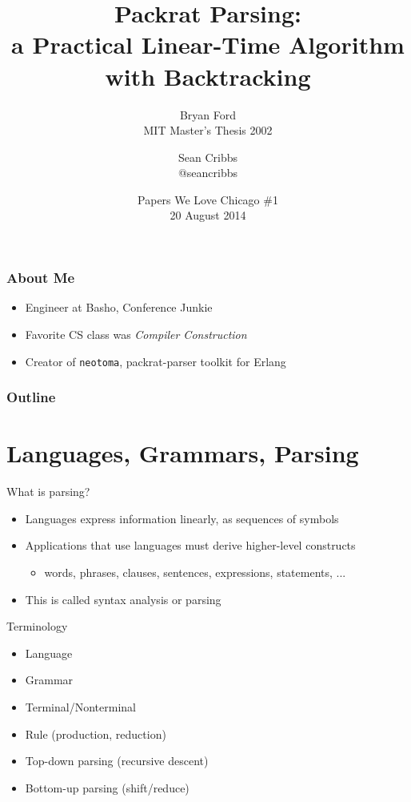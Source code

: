 \documentclass{beamer}
\title[Packrat Parsing]{Packrat Parsing:
  \\a Practical Linear-Time
  Algorithm with Backtracking}
\subtitle{Bryan Ford \\
  MIT Master's Thesis 2002}
\author[Sean Cribbs]{\Large Sean Cribbs \\
  \small{@seancribbs}}
\date[Papers We Love Chicago]{Papers We Love Chicago \#1 \\
  20 August 2014}
\begin{document}
\begin{frame}
  \maketitle
\end{frame}

\begin{frame}
\frametitle{About Me}
\begin{itemize}
\item Engineer at Basho, Conference Junkie
\item Favorite CS class was \textit{Compiler Construction}
\item Creator of \texttt{neotoma}, packrat-parser toolkit for Erlang
\end{itemize}
\end{frame}

\begin{frame}
\frametitle{Outline}
\tableofcontents
\end{frame}

\section[Background]{Languages, Grammars, Parsing}
\begin{frame}{What is parsing?}
  \begin{itemize}
  \item Languages express information linearly, as sequences of
    symbols
  \item Applications that use languages must derive higher-level
    constructs
    \begin{itemize}
    \item words, phrases, clauses, sentences, expressions, statements,
      ...
    \end{itemize}
  \item This is called \alert{syntax analysis} or \alert{parsing}
  \end{itemize}
\end{frame}

\begin{frame}{Terminology}
  \begin{itemize}
  \item Language
  \item Grammar
  \item Terminal/Nonterminal
  \item Rule (production, reduction)
  \item Top-down parsing (recursive descent)
  \item Bottom-up parsing (shift/reduce)
  \end{itemize}
\end{frame}
\end{document}
